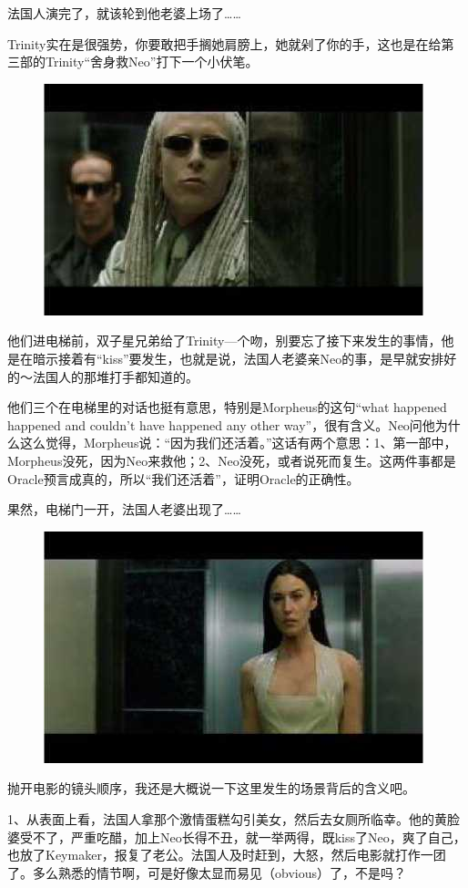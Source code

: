\documentclass[UTF8]{ctexart}
\begin{document}
法国人演完了，就该轮到他老婆上场了……

Trinity实在是很强势，你要敢把手搁她肩膀上，她就剁了你的手，这也是在给第三部的Trinity“舍身救Neo”打下一个小伏笔。

\begin{figure}[htb]
\centering
\includegraphics[width=0.5\linewidth]{fig/read_reloaded-101}
\end{figure}

他们进电梯前，双子星兄弟给了Trinity—个吻，别要忘了接下来发生的事情，他是在暗示接着有“kiss”要发生，也就是说，法国人老婆亲Neo的事，是早就安排好的～法国人的那堆打手都知道的。

他们三个在电梯里的对话也挺有意思，特别是Morpheus的这句“what happened happened and couldn't have happened any other way”，很有含义。Neo问他为什么这么觉得，Morpheus说：“因为我们还活着。”这话有两个意思：1、第一部中，Morpheus没死，因为Neo来救他；2、Neo没死，或者说死而复生。这两件事都是Oracle预言成真的，所以“我们还活着”，证明Oracle的正确性。

果然，电梯门一开，法国人老婆出现了……

\begin{figure}[htb]
\centering
\includegraphics[width=0.5\linewidth]{fig/read_reloaded-102}
\end{figure}

抛开电影的镜头顺序，我还是大概说一下这里发生的场景背后的含义吧。

1、从表面上看，法国人拿那个激情蛋糕勾引美女，然后去女厕所临幸。他的黄脸婆受不了，严重吃醋，加上Neo长得不丑，就一举两得，既kiss了Neo，爽了自己，也放了Keymaker，报复了老公。法国人及时赶到，大怒，然后电影就打作一团了。多么熟悉的情节啊，可是好像太显而易见（obvious）了，不是吗？
\end{document}
